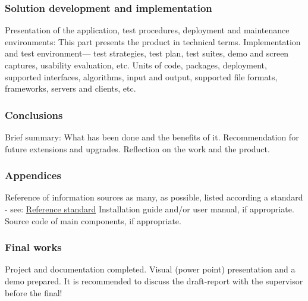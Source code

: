 \subsubsection{Solution development and implementation}
Presentation of the application, test procedures, deployment and maintenance environments: This  part presents the product in technical terms. Implementation and test environment— test strategies, test plan, test suites, demo and screen captures, usability evaluation, etc. Units of code, packages, deployment, supported interfaces, algorithms, input and output, supported file formats, frameworks,  servers and clients, etc.

\subsubsection{Conclusions}
Brief summary: What has been done and the benefits of it. Recommendation for future extensions and upgrades. Reflection on the work and the product.

\subsubsection{Appendices}
Reference of information sources as many, as possible, listed according a standard - see:
\newline
\href{https://ieee-dataport.org/sites/default/files/analysis/27/IEEE20Citation20Guidelines.pdf)}{Reference standard}   
\newline
Installation guide and/or user manual, if appropriate. Source code of main components, if appropriate.

\subsubsection{Final  works}
Project and documentation completed. Visual (power  point) presentation and a demo prepared. It is recommended to discuss the draft-report with the supervisor before the final!